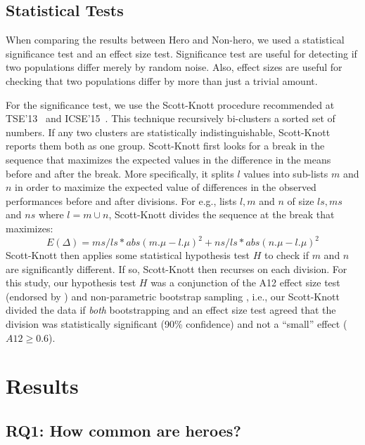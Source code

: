 \documentclass[sigconf]{acmart}
\theoremstyle{break}
\begin{document}
\subsection{Statistical Tests}
\label{sec:stats}


When comparing the results between Hero and Non-hero, we used a statistical
significance test and an effect size test.
Significance test are useful for detecting if two populations
differ merely by random noise. 
Also, effect sizes are useful for checking that two populations differ by more than just a trivial amount.

For the significance test,  we use the 
     Scott-Knott procedure  recommended at TSE'13~\cite{mittas2013ranking} and ICSE'15~\cite{ghotra2015revisiting}. This
     technique recursively bi-clusters a sorted
    set of numbers. If any two clusters are statistically indistinguishable, Scott-Knott
    reports them both as one group.
    Scott-Knott first looks for a break in the sequence that maximizes the expected
    values in the difference in the means before and after the break.
    More specifically,  it  splits $l$ values into sub-lists $m$ and $n$ in order to maximize the expected value of differences  in the observed performances before and after divisions. For e.g., lists $l,m$ and $n$ of size $ls,ms$ and $ns$ where $l=m\cup n$, Scott-Knott divides the sequence at the break that maximizes:
     \[E(\Delta)=ms/ls*abs(m.\mu - l.\mu)^2 + ns/ls*abs(n.\mu - l.\mu)^2\]
Scott-Knott then applies some statistical hypothesis test $H$ to check if $m$ and $n$ are significantly different. If so, Scott-Knott then recurses on each division.
    For this study, our hypothesis test $H$ was a conjunction of the A12 effect size test (endorsed by
    \cite{arcuri2011practical})  and non-parametric bootstrap sampling \cite{efron94}, i.e., our Scott-Knott divided the data if {\em both}
    bootstrapping and an effect size test agreed that the division was statistically significant (90\% confidence) and not a ``small'' effect ($A12 \ge 0.6$).
   
   

\section{Results}
\label{sec:results}

\subsection{RQ1: How common are heroes?}
\label{sec:rq1}
\end{document}
